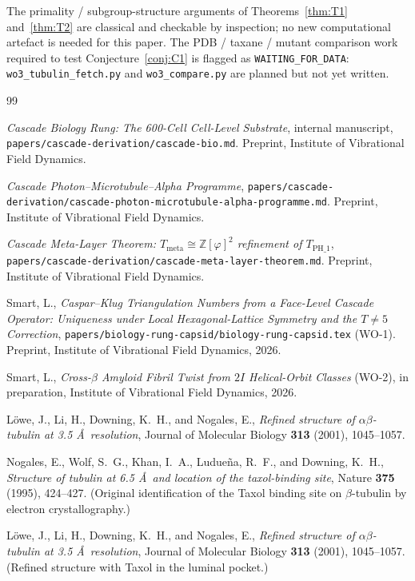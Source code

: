 \documentclass[12pt]{article}
\begin{document}
The primality / subgroup-structure arguments of
Theorems~\ref{thm:T1} and~\ref{thm:T2} are classical and
checkable by inspection; no new computational artefact is needed
for this paper. The PDB / taxane / mutant comparison work
required to test Conjecture~\ref{conj:C1} is flagged as
\texttt{WAITING\_FOR\_DATA}: \texttt{wo3\_tubulin\_fetch.py} and
\texttt{wo3\_compare.py} are planned but not yet written.

\begin{thebibliography}{99}

\emph{Cascade Biology Rung: The 600-Cell Cell-Level Substrate},
internal manuscript,
\texttt{papers/cascade-derivation/cascade-bio.md}. Preprint,
Institute of Vibrational Field Dynamics.

\emph{Cascade Photon--Microtubule--Alpha Programme},
\texttt{papers/cascade-derivation/cascade-photon-microtubule-alpha-programme.md}.
Preprint, Institute of Vibrational Field Dynamics.

\emph{Cascade Meta-Layer Theorem: $T_{\mathrm{meta}} \cong
\mathbb{Z}[\varphi]^2$ refinement of $T_{\mathrm{PH}\_1}$},
\texttt{papers/cascade-derivation/cascade-meta-layer-theorem.md}.
Preprint, Institute of Vibrational Field Dynamics.

Smart, L.,
\emph{Caspar--Klug Triangulation Numbers from a Face-Level
Cascade Operator: Uniqueness under Local Hexagonal-Lattice
Symmetry and the $T \neq 5$ Correction},
\texttt{papers/biology-rung-capsid/biology-rung-capsid.tex}
(WO-1). Preprint, Institute of Vibrational Field Dynamics, 2026.

Smart, L.,
\emph{Cross-$\beta$ Amyloid Fibril Twist from $2I$ Helical-Orbit
Classes} (WO-2), in preparation, Institute of Vibrational Field
Dynamics, 2026.

L\"owe, J., Li, H., Downing, K.~H., and Nogales, E.,
\emph{Refined structure of $\alpha\beta$-tubulin at 3.5 \AA\
resolution},
Journal of Molecular Biology \textbf{313} (2001), 1045--1057.

Nogales, E., Wolf, S.~G., Khan, I.~A., Ludue\~na, R.~F., and
Downing, K.~H.,
\emph{Structure of tubulin at 6.5 \AA\ and location of the
taxol-binding site},
Nature \textbf{375} (1995), 424--427. (Original identification of
the Taxol binding site on $\beta$-tubulin by electron
crystallography.)

L\"owe, J., Li, H., Downing, K.~H., and Nogales, E.,
\emph{Refined structure of $\alpha\beta$-tubulin at 3.5 \AA\
resolution},
Journal of Molecular Biology \textbf{313} (2001), 1045--1057.
(Refined structure with Taxol in the luminal pocket.)


\end{thebibliography}
\end{document}
